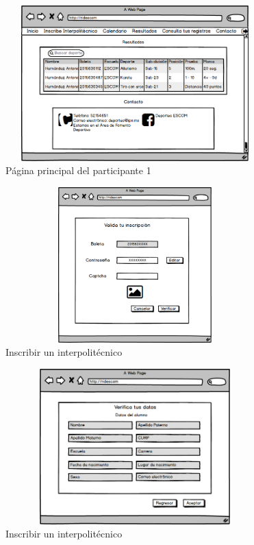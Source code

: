 		\begin{figure}[hbt!]
			\centering
			\includegraphics[width=10cm, height=6cm]{Imagenes/Disenos/p14Iniciopaticipante1.png}
			\caption{Página principal del participante 1}
			\label{Inicioparticipante1}
		\end{figure}
			\pagebreak
	
		\begin{figure}[hbt!]
			\centering
			\includegraphics[width=10cm, height=6cm]{Imagenes/Disenos/p15InscripcionInterpolitecnico1.png}
			\caption{Inscribir un interpolitécnico}
			\label{Inscripcioninterpolitecnico}
		\end{figure}
	
		\begin{figure}[hbt!]
			\centering
			\includegraphics[width=10cm, height=6cm]{Imagenes/Disenos/p16InscripcionInterpolitecnico2.png}
			\caption{Inscribir un interpolitécnico}
			\label{Inscripcioninterpolitecnico2}
		\end{figure}
	
